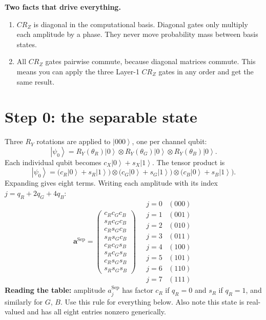 \documentclass[11pt]{article}
\newcommand{\ket}[1]{\left| #1 \right\rangle}
\begin{document}
\textbf{Two facts that drive everything.}
\begin{enumerate}
\item $CR_Z$ is diagonal in the computational basis. Diagonal gates only multiply each amplitude by a phase. They never move probability mass between basis states.
\item All $CR_Z$ gates pairwise commute, because diagonal matrices commute. This means you can apply the three Layer-1 $CR_Z$ gates in any order and get the same result.
\end{enumerate}

\section{Step 0: the separable state}

Three $R_Y$ rotations are applied to $\ket{000}$, one per channel qubit:
\[
\ket{\psi_0} = R_Y(\theta_R) \ket{0} \otimes R_Y(\theta_G) \ket{0} \otimes R_Y(\theta_B) \ket{0}.
\]
Each individual qubit becomes $c_X \ket{0} + s_X \ket{1}$. The tensor product is
\[
\ket{\psi_0} = \bigl(c_R \ket{0} + s_R \ket{1}\bigr) \otimes \bigl(c_G \ket{0} + s_G \ket{1}\bigr) \otimes \bigl(c_B \ket{0} + s_B \ket{1}\bigr).
\]
Expanding gives eight terms. Writing each amplitude with its index $j = q_R + 2 q_G + 4 q_B$:
\[
\mathbf{a}^\text{Sep} = \begin{pmatrix} c_R c_G c_B \\ s_R c_G c_B \\ c_R s_G c_B \\ s_R s_G c_B \\ c_R c_G s_B \\ s_R c_G s_B \\ c_R s_G s_B \\ s_R s_G s_B \end{pmatrix}
\quad
\begin{matrix}
j=0 & (000) \\ j=1 & (001) \\ j=2 & (010) \\ j=3 & (011) \\ j=4 & (100) \\ j=5 & (101) \\ j=6 & (110) \\ j=7 & (111)
\end{matrix}
\]
\textbf{Reading the table:} amplitude $a^\text{Sep}_j$ has factor $c_R$ if $q_R = 0$ and $s_R$ if $q_R = 1$, and similarly for $G$, $B$. Use this rule for everything below. Also note this state is real-valued and has all eight entries nonzero generically.
\end{document}
